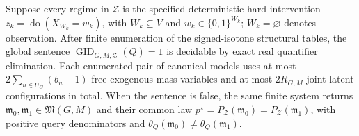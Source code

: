 Suppose every regime in \(\mathcal Z\) is the specified deterministic hard intervention \(z_k=\operatorname{do}(X_{W_k}=w_k)\), with \(W_k\subseteq V\) and \(w_k\in\{0,1\}^{W_k}\); \(W_k=\varnothing\) denotes observation. After finite enumeration of the signed-isotone structural tables, the global sentence \(\operatorname{GID}_{G,M,\mathcal Z}(Q)=1\) is decidable by exact real quantifier elimination. Each enumerated pair of canonical models uses at most \(2\sum_{u\in U_G}(b_u-1)\) free exogenous-mass variables and at most \(2R_{G,M}\) joint latent configurations in total. When the sentence is false, the same finite system returns \(\mathfrak m_0,\mathfrak m_1\in\mathfrak M(G,M)\) and their common law \(p^{\star}=P_{\mathcal Z}(\mathfrak m_0)=P_{\mathcal Z}(\mathfrak m_1)\), with positive query denominators and \(\theta_Q(\mathfrak m_0)\ne\theta_Q(\mathfrak m_1)\).